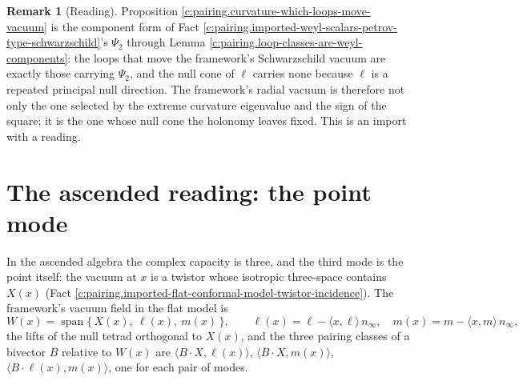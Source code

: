 \documentclass[11pt]{article}
\theoremstyle{definition}
\newtheorem{remark}[theorem]{Remark}
\theoremstyle{plain}
\providecommand{\ninf}{}\renewcommand{\ninf}{n_{\infty}}
\providecommand{\ip}{}\renewcommand{\ip}[2]{\langle #1, #2\rangle}
\begin{document}
\begin{remark}[Reading]\label{c:note.pairing.reading-3}
Proposition \ref{c:pairing.curvature-which-loops-move-vacuum} is the component form of Fact \ref{c:pairing.imported-weyl-scalars-petrov-type-schwarzschild}'s $\Psi_{2}$ through Lemma \ref{c:pairing.loop-classes-are-weyl-components}: the loops that move the framework's Schwarzschild vacuum are exactly those carrying $\Psi_{2}$, and the null cone of $\ell$ carries none because $\ell$ is a repeated principal null direction. The framework's radial vacuum is therefore not only the one selected by the extreme curvature eigenvalue and the sign of the square; it is the one whose null cone the holonomy leaves fixed. This is an import with a reading.
\end{remark}

\section{The ascended reading: the point mode}

\label{c:note.pairing.setting-ascended-reading-point-mode}
In the ascended algebra the complex capacity is three, and the third mode is the point itself: the vacuum at $x$ is a twistor whose isotropic three-space contains $X(x)$ (Fact \ref{c:pairing.imported-flat-conformal-model-twistor-incidence}). The framework's vacuum field in the flat model is
\[
W(x) = \operatorname{span}\{\,X(x),\ \ell(x),\ m(x)\,\}, \qquad \ell(x) = \ell - \ip{x}{\ell}\,\ninf, \quad m(x) = m - \ip{x}{m}\,\ninf ,
\]
the lifts of the null tetrad orthogonal to $X(x)$, and the three pairing classes of a bivector $B$ relative to $W(x)$ are $\ip{B\cdot X}{\ell(x)}$, $\ip{B\cdot X}{m(x)}$, $\ip{B\cdot\ell(x)}{m(x)}$, one for each pair of modes.
\end{document}
